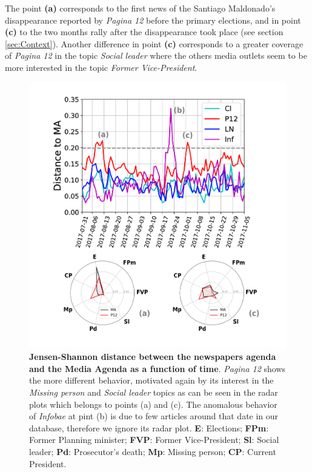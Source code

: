 \documentclass[a4paper, 12pt]{article}
\begin{document}
\par The point \textbf{(a)} corresponds  to the first news of the Santiago Maldonado's disappearance  reported by \emph{Pagina 12} before the primary elections, and in point \textbf{(c)} to  the two months rally after the disappearance took place (see section \ref{sec:Context}). Another difference in point \textbf{(c)} corresponds to a greater coverage of \emph{Pagina 12} in the topic \emph{Social leader} where the others media outlets seem to be more interested in the topic \emph{Former Vice-President}.

\begin{figure}[h]
\centering
\includegraphics[width = \textwidth]{images/Fig6.pdf}
\caption{\textbf{Jensen-Shannon distance between the newspapers agenda and the Media Agenda as a function of time}. \emph{Pagina 12} shows the more different behavior, motivated again by its interest in the \emph{Missing person} and \emph{Social leader} topics as can be seen in the radar plots which belongs to points (a) and (c). The anomalous behavior of \emph{Infobae} at pint (b) is due to few articles around that date in our database, therefore we ignore its radar plot. \textbf{E}: Elections; \textbf{FPm}: Former Planning minister; \textbf{FVP}: Former Vice-President; \textbf{Sl}: Social leader; \textbf{Pd}: Prosecutor's death; \textbf{Mp}: Missing person; \textbf{CP}: Current President.}
\label{fig:jensen_shannon_news}
\end{figure}
\end{document}
